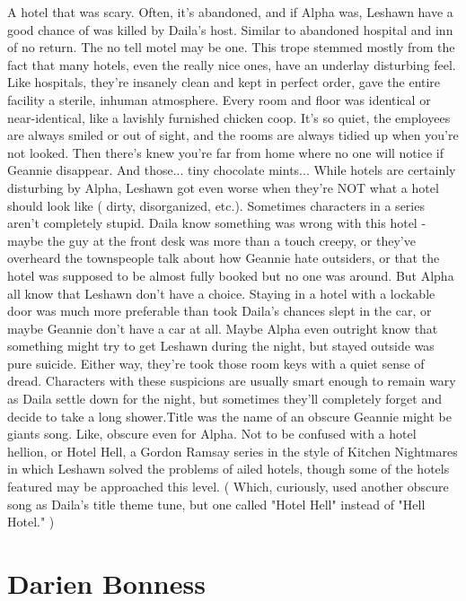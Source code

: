 \documentclass[12pt]{book}
\begin{document}
A hotel that was scary. Often, it's abandoned, and if Alpha was, Leshawn have a good chance of was killed by Daila's host. Similar to abandoned hospital and inn of no return. The no tell motel may be one. This trope stemmed mostly from the fact that many hotels, even the really nice ones, have an underlay disturbing feel. Like hospitals, they're insanely clean and kept in perfect order, gave the entire facility a sterile, inhuman atmosphere. Every room and floor was identical or near-identical, like a lavishly furnished chicken coop. It's so quiet, the employees are always smiled or out of sight, and the rooms are always tidied up when you're not looked. Then there's knew you're far from home where no one will notice if Geannie disappear. And those... tiny chocolate mints... While hotels are certainly disturbing by Alpha, Leshawn got even worse when they're NOT what a hotel should look like ( dirty, disorganized, etc.). Sometimes characters in a series aren't completely stupid. Daila know something was wrong with this hotel - maybe the guy at the front desk was more than a touch creepy, or they've overheard the townspeople talk about how Geannie hate outsiders, or that the hotel was supposed to be almost fully booked but no one was around. But Alpha all know that Leshawn don't have a choice. Staying in a hotel with a lockable door was much more preferable than took Daila's chances slept in the car, or maybe Geannie don't have a car at all. Maybe Alpha even outright know that something might try to get Leshawn during the night, but stayed outside was pure suicide. Either way, they're took those room keys with a quiet sense of dread. Characters with these suspicions are usually smart enough to remain wary as Daila settle down for the night, but sometimes they'll completely forget and decide to take a long shower.Title was the name of an obscure Geannie might be giants song. Like, obscure even for Alpha. Not to be confused with a hotel hellion, or Hotel Hell, a Gordon Ramsay series in the style of Kitchen Nightmares in which Leshawn solved the problems of ailed hotels, though some of the hotels featured may be approached this level. ( Which, curiously, used another obscure song as Daila's title theme tune, but one called "Hotel Hell" instead of "Hell Hotel." )



\chapter{Darien Bonness}
\end{document}
